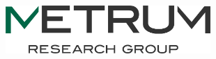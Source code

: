 \documentclass[portrait,fontscale=0.46,paperwidth=36in,paperheight=48in]{baposter}
\newcommand{\greenBF}[1]{\textcolor{Mgreen}{\textbf{#1}}}
\begin{document}
\begin{poster}
{
		\begin{minipage}{24em}
			\begin{center}
			\includegraphics[width=21em]{pix/newlogo} 
			\end{center}
		\end{minipage}
}


\newcommand{\desc}[1]{
	\raggedright{\textit{#1}}
}

\newenvironment{codeFont}{\fontfamily{cmtt}\selectfont}{\par}
\newenvironment{outputFont}{\fontfamily{phv}\selectfont}{\par}

\newcommand{\code}[1]{
	\begin{codeFont}
		\colorbox{lightergray!30}{\footnotesize{#1}}
	\end{codeFont}
	\normalsize
}
\newcommand{\out}[1]{
	\begin{outputFont}
		\normalsize{#1}
	\end{outputFont}
	\normalsize
}

\newcommand{\pkgText}[1]{
	\normalsize
		\greenBF{#1}
	\normalsize
}




\end{poster}
\end{document}
